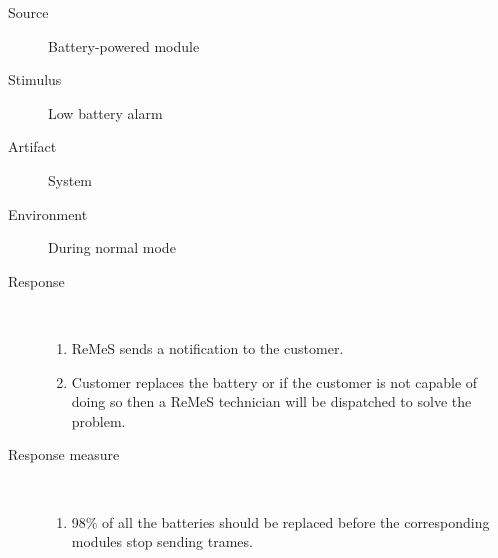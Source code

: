 \begin{description}
	\item[Source] Battery-powered module
	\item[Stimulus] Low battery alarm
	\item[Artifact] System
	\item[Environment] During normal mode 
	\item[Response] \
	\begin{enumerate}
	  \item ReMeS sends a notification to the customer.
	  \item Customer replaces the battery or if the customer is not capable of
	  doing so then a ReMeS technician will be dispatched to solve the problem.
	\end{enumerate}
	\item[Response measure] \
	\begin{enumerate}
	  \item 98\% of all the batteries should be replaced before the corresponding
	  modules stop sending trames.
	\end{enumerate}
\end{description}